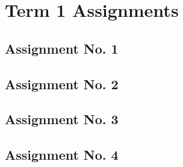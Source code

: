 \chapter{Term 1 Assignments}
\section{Assignment No. 1}
\section{Assignment No. 2}           
\section{Assignment No. 3}
\section{Assignment No. 4}